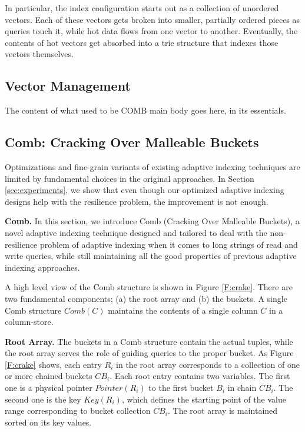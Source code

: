 \documentclass{sig-alternate}
\begin{document}
In particular, the index configuration starts out as a collection of unordered vectors. Each of these vectors gets broken into smaller, partially ordered pieces as queries touch it, while hot data flows from one vector to another. Eventually, the contents of hot vectors get absorbed into a trie structure that indexes those vectors themselves.


\subsection{Vector Management}\label{sec:vectors}

The content of what used to be COMB main body goes here, in its essentials.

\subsection{Comb: Cracking Over Malleable Buckets}
Optimizations and fine-grain variants of existing adaptive indexing techniques are limited
by fundamental choices in the original approaches.
In Section \ref{sec:experiments}, we show that even though our optimized adaptive indexing designs
help with the resilience problem, the improvement is not enough.

\textbf{Comb.}
In this section, we introduce Comb (Cracking Over Malleable Buckets),
a novel adaptive indexing technique designed and tailored
to deal with the non-resilience problem of adaptive indexing when it comes to long strings of read and write queries,
while still maintaining all the good properties of previous adaptive indexing approaches.



A high level view of the Comb structure is shown in Figure \ref{F:crake}.
There are two fundamental components; (a) the root array and (b) the buckets.
A single Comb structure $Comb(C)$ maintains the contents of a single column $C$ in a column-store.

\textbf{Root Array.}
The buckets in a Comb structure contain the actual tuples, while the root array serves the role
of guiding queries to the proper bucket.
As Figure \ref{F:crake} shows, each entry $R_i$ in the root array corresponds to a collection
of one or more chained buckets $CB_i$.
Each root entry contains two variables. The first one is a physical pointer $Pointer(R_i)$
to the first bucket $B_i$ in chain $CB_i$.
The second one is the key $Key(R_i)$, which defines the starting point of the value range corresponding to bucket
collection $CB_i$.
The root array is maintained sorted on its key values.
\end{document}
